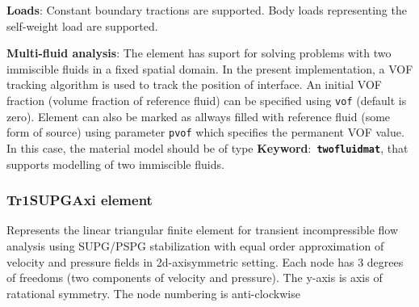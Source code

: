 \documentclass[a4paper]{article}
\newcommand{\descitem}[1]{{\noindent \bf #1}:}
\newcommand{\elemkeyword}[1]{\descitem{Keyword}~{\bf \texttt{#1}}}
\newcommand{\param}[1]{{\texttt{#1}}}
\begin{document}
\descitem{Loads} Constant boundary tractions are supported. Body loads
representing the self-weight load are supported.

\descitem{Multi-fluid analysis} The element has suport for solving
problems with two immiscible fluids in
a fixed spatial domain. In the present implementation, a VOF tracking algorithm
is used to track the position of interface. An initial VOF fraction
(volume fraction of reference fluid) can be specified using
\param{vof} (default is zero). Element can also be marked as allways
filled with reference fluid (some form of source) using parameter
\param{pvof} which specifies the permanent VOF value. In this case,
the material model should be of type \elemkeyword{twofluidmat}, that
supports modelling of two immiscible fluids.

\subsubsection{Tr1SUPGAxi element}
\label{Tr1SUPGAxi}
Represents the linear triangular finite element for transient
incompressible flow analysis using SUPG/PSPG stabilization with equal order
approximation of velocity and pressure fields in 2d-axisymmetric setting. Each node has 3 degrees
of freedoms (two components of velocity and pressure). The y-axis is
axis of ratational symmetry. The node numbering is anti-clockwise
\end{document}
